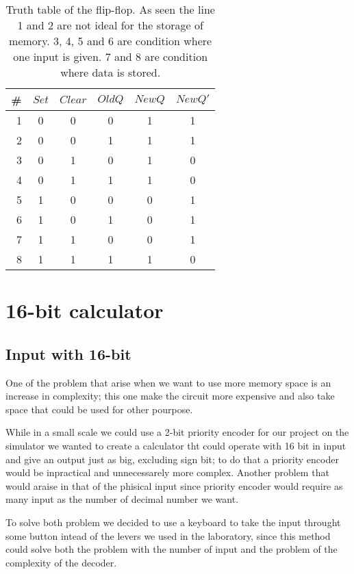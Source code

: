 \documentclass{article}
\begin{document}
\begin{table}[h!]
\centering
\begin{tabular}{ | c | c  c  c | c  c |}
\hline
 \# & $Set$ & $Clear$ & $Old Q$ & $New Q$ & $New Q'$\\
\hline
 \ 1 & 0 & 0 & 0 & 1 & 1 \\ 
 \ 2 & 0 & 0 & 1 & 1 & 1 \\
\hline 
 \ 3 & 0 & 1 & 0 & 1 & 0 \\ 
 \ 4 & 0 & 1 & 1 & 1 & 0 \\ 
 \ 5 & 1 & 0 & 0 & 0 & 1 \\
 \ 6 & 1 & 0 & 1 & 0 & 1 \\
\hline
 \ 7 & 1 & 1 & 0 & 0 & 1 \\
 \ 8 & 1 & 1 & 1 & 1 & 0 \\ 
\hline
\end{tabular}
\caption{Truth table of the flip-flop. As seen the line 1 and 2 are not ideal for the storage of memory. 3, 4, 5 and 6 are condition where one input is given. 7 and 8 are condition where data is stored.}
\label{table:1}
\end{table}




\section{16-bit calculator}



\subsection{Input with 16-bit}

One of the problem that arise when we want to use more memory space is an increase in complexity; this one make the circuit more expensive and also take space that could be used for other pourpose. 

While in a small scale we could use a 2-bit priority encoder for our project on the simulator we wanted to create a calculator tht could operate with 16 bit in input and give an output just as big, excluding sign bit; to do that a priority encoder would be inpractical and unnecessarely more complex.
Another problem that would araise in that of the phisical input since  priority encoder would require as many input as the number of decimal number we want.

\vspace{3mm}

To solve both problem we decided to use a keyboard to take the input throught some button intead of the levers we used in the laboratory, since this method could solve both the problem with the number of input and the problem of the complexity of the decoder.
\end{document}
